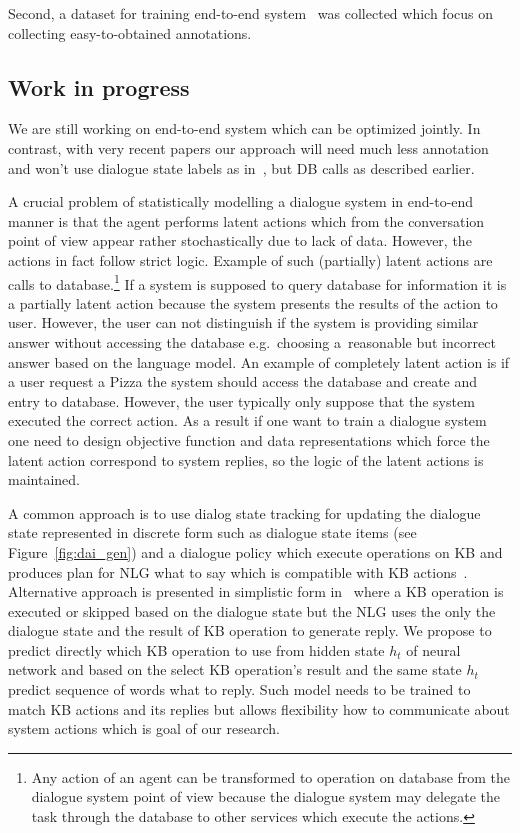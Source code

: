 \documentclass[11pt]{article}
\begin{document}
Second, a dataset for training end-to-end system~\cite{platek2016wochat} was collected which focus on collecting easy-to-obtained annotations.

\subsection{Work in progress}
We are still working on end-to-end system which can be optimized jointly.
In contrast, with very recent papers our approach will need much less annotation and won't use dialogue state labels as in~\cite{wen_networkbased_2016}, but DB calls as described earlier.

A crucial problem of statistically modelling a dialogue system in end-to-end manner is that the agent performs latent actions which from the conversation point of view appear rather stochastically due to lack of data.
However, the actions in fact follow strict logic.
Example of such (partially) latent actions are calls to database.\footnote{Any action of an agent can be transformed to operation on database from the dialogue system point of view because the dialogue system may delegate the task through the database to other services which execute the actions.}
If a system is supposed to query database for information it is a partially latent action because the system presents the results of the action to user.
However, the user can not distinguish if the system is providing similar answer without accessing the database e.g.~choosing a~reasonable but incorrect answer based on the language model.
An example of completely latent action is if a user request a Pizza the system should access the database and create and entry to database.
However, the user typically only suppose that the system executed the correct action.
As a result if one want to train a dialogue system one need to design objective function and data representations which force the latent action correspond to system replies, so the logic of the latent actions is maintained.

A common approach is to use dialog state tracking for updating the dialogue state represented in discrete form such as dialogue state items (see Figure~\ref{fig:dai_gen}) and a dialogue policy which execute operations on KB and produces plan for NLG what to say which is compatible with KB actions~\cite{dusek_sequence2sequence_2016,young2010hidden}.
Alternative approach is presented in simplistic form in~\cite{wen_networkbased_2016} where a KB operation is executed or skipped based on the dialogue state but the NLG uses the only the dialogue state and the result of KB operation to generate reply.
We propose to predict directly which KB operation to use from hidden state $h_t$ of neural network and based on the select KB operation's result and the same state $h_t$ predict sequence of words what to reply.
Such model needs to be trained to match KB actions and its replies but allows flexibility how to communicate about system actions which is goal of our research.
\end{document}

